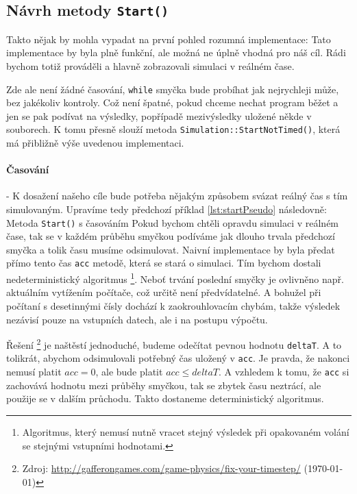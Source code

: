 \subsection{Návrh metody \texttt{Start()}}
\label{sec:startMetoda}
Takto nějak by mohla vypadat na první pohled rozumná implementace:
Tato implementace by byla plně funkční, ale možná ne úplně vhodná pro náš cíl. Rádi bychom totiž prováděli a hlavně zobrazovali simulaci v reálném čase. 

Zde ale není žádné časování, \texttt{while} smyčka bude probíhat jak nejrychleji může, bez jakékoliv kontroly. Což není špatné, pokud chceme nechat program běžet a jen se pak podívat na výsledky, popřípadě mezivýsledky uložené někde v souborech. K tomu přesně slouží metoda \texttt{Simulation::StartNotTimed()}, která má přibližně výše uvedenou implementaci. 
\paragraph{Časování}
- K dosažení našeho cíle bude potřeba nějakým způsobem svázat reálný čas s tím simulovaným. Upravíme tedy předchozí příklad \ref{lst:startPseudo} následovně:
{Metoda \texttt{Start()} s časováním}
Pokud bychom chtěli opravdu simulaci v reálném čase, tak se v každém průběhu smyčkou podíváme jak dlouho trvala předchozí smyčka a tolik času musíme odsimulovat. Naivní implementace by byla předat přímo tento čas \texttt{acc} metodě, která se stará o simulaci. Tím bychom dostali nedeterministický algoritmus
\footnote{Algoritmus, který nemusí nutně vracet stejný výsledek při opakovaném volání se stejnými vstupními hodnotami.}.
Neboť trvání poslední smyčky je ovlivněno např. aktuálním vytížením počítače, což určitě není předvídatelné. A bohužel při počítaní s desetinnými čísly dochází k zaokrouhlovacím chybám, takže výsledek nezávisí pouze na vstupních datech, ale i na postupu výpočtu.

Řešení \footnote{Zdroj: \url{http://gafferongames.com/game-physics/fix-your-timestep/} (\today)}
je naštěstí jednoduché, budeme odečítat pevnou hodnotu \texttt{deltaT}.
A to tolikrát, abychom odsimulovali potřebný čas uložený v \texttt{acc}. Je pravda,
že nakonci nemusí platit $ acc=0 $, ale bude platit $ acc\leq deltaT $. A vzhledem k tomu, že \texttt{acc} si zachovává hodnotu mezi průběhy smyčkou, tak se zbytek času neztrácí, ale použije se v dalším průchodu. Takto dostaneme deterministický algoritmus.


